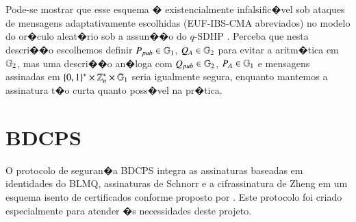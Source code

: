 \documentclass[a4paper,capchap,espacoduplo,normaltoc]{abntepusp}
\begin{document}
Pode-se mostrar que esse esquema � existencialmente infalsific�vel sob ataques de mensagens adaptativamente escolhidas (EUF-IBS-CMA abreviados) no modelo do or�culo aleat�rio sob a assun��o do $q$-SDHP \cite[section~3.1]{barreto-libert-mccullagh-quisquater}. Perceba que nesta descri��o escolhemos definir $P_{pub} \in \mathbb{G}_1$, $Q_A \in \mathbb{G}_2$ para evitar a aritm�tica em $\mathbb{G}_2$, mas uma descri��o an�loga com $Q_{pub} \in \mathbb{G}_2$, $P_A \in \mathbb{G}_1$ e mensagens assinadas em $\{0, 1\}^\ast \times \mathbb{Z}_n^\ast \times \mathbb{G}_1$ seria igualmente segura, enquanto mantemos a assinatura t�o curta quanto poss�vel na pr�tica.

\section{BDCPS}

O protocolo de seguran�a BDCPS \cite{bdcps} integra as assinaturas baseadas em identidades do BLMQ, assinaturas de Schnorr \cite{schnorr} e a cifrassinatura de Zheng \cite{zheng} em um esquema isento de certificados conforme proposto por \cite{al-riyami-paterson}. Este protocolo foi criado especialmente para atender �s necessidades deste projeto.
\end{document}
